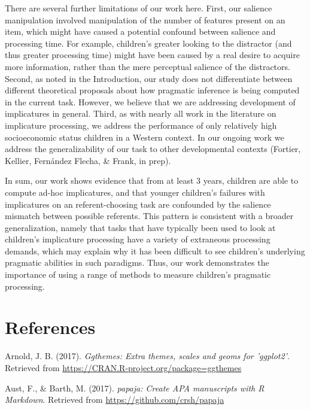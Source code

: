 \documentclass[man]{apa6}
\begin{document}
There are several further limitations of our work here. First, our
salience manipulation involved manipulation of the number of features
present on an item, which might have caused a potential confound between
salience and processing time. For example, children's greater looking to
the distractor (and thus greater processing time) might have been caused
by a real desire to acquire more information, rather than the mere
perceptual salience of the distractors. Second, as noted in the
Introduction, our study does not differentiate between different
theoretical proposals about how pragmatic inference is being computed in
the current task. However, we believe that we are addressing development
of implicatures in general. Third, as with nearly all work in the
literature on implicature processing, we address the performance of only
relatively high socioeconomic status children in a Western context. In
our ongoing work we address the generalizability of our task to other
developmental contexts (Fortier, Kellier, Fernández Flecha, \& Frank, in
prep).

In sum, our work shows evidence that from at least 3 years, children are
able to compute ad-hoc implicatures, and that younger children's
failures with implicatures on an referent-choosing task are confounded
by the salience mismatch between possible referents. This pattern is
consistent with a broader generalization, namely that tasks that have
typically been used to look at children's implicature processing have a
variety of extraneous processing demands, which may explain why it has
been difficult to see children's underlying pragmatic abilities in such
paradigms. Thus, our work demonstrates the importance of using a range
of methods to measure children's pragmatic processing.

\newpage

\section{References}\label{references}

\setlength{\parindent}{-0.5in} \setlength{\leftskip}{0.5in}

\hypertarget{refs}{}
\hypertarget{ref-R-ggthemes}{}
Arnold, J. B. (2017). \emph{Ggthemes: Extra themes, scales and geoms for
'ggplot2'}. Retrieved from
\url{https://CRAN.R-project.org/package=ggthemes}

\hypertarget{ref-R-papaja}{}
Aust, F., \& Barth, M. (2017). \emph{papaja: Create APA manuscripts with
R Markdown}. Retrieved from \url{https://github.com/crsh/papaja}
\end{document}
